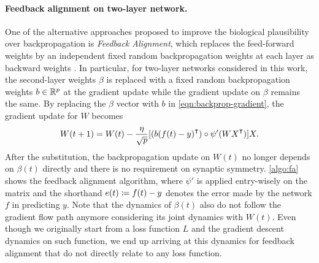 \paragraph{Feedback alignment on two-layer network.}

One of the alternative approaches proposed to improve the biological plausibility over backpropagation is \emph{Feedback Alignment}, which replaces the feed-forward weights by an independent fixed random backpropagation weights at each layer as backward weights \citep{lillicrap2016random}. In particular, for two-layer networks considered in this work, the second-layer weights $\beta$ is replaced with a fixed random backpropagation weights $b\in{\mathbb{R}^{p}}$ at the gradient update while the gradient update on $\beta$ remains the same. By replacing the $\beta$ vector with $b$ in \cref{eqn:backprop-gradient}, the gradient update for $W$ becomes
\begin{align}\label{eqn:alignment-update}
    W(t+1) = W(t) - \frac{\eta}{\sqrt{p}} [(b (f(t) - y)\transpose)\circ \psi'(WX\transpose)] X.
\end{align}
After the substitution, the backpropagation update on $W(t)$ no longer depends on $\beta(t)$ directly and there is no requirement on synaptic symmetry. \cref{algo:fa} shows the feedback alignment algorithm, where $\psi'$ is applied entry-wisely on the matrix and the shorthand $e(t) \coloneqq f(t) -y$ denotes the error made by the network $f$ in predicting $y$. Note that the dynamics of $\beta(t)$ also do not follow the gradient flow path anymore considering its joint dynamics with $W(t)$. Even though we originally start from a loss function $L$ and the gradient descent dynamics on such function, we end up arriving at this dynamics for feedback alignment that do not directly relate to any loss function.

